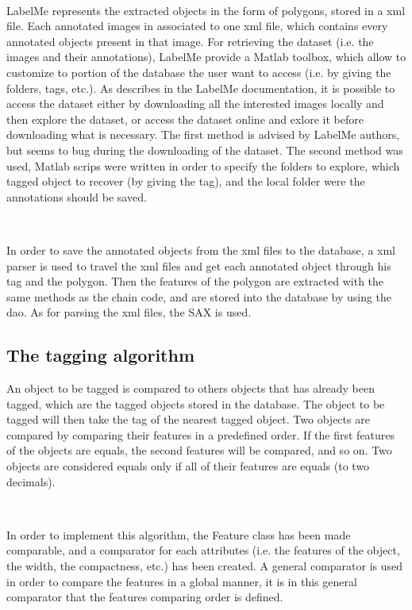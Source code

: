 ~~

LabelMe represents the extracted objects in the form of polygons, stored in a xml file. Each annotated images in associated to one xml file, which contains every annotated objects present in that image. For retrieving the dataset (i.e. the images and their annotations), LabelMe provide a Matlab toolbox, which allow to customize to portion of the database the user want to access (i.e. by giving the folders, tags, etc.). As describes in the LabelMe documentation, it is possible to access the dataset either by downloading all the interested images locally and then explore the dataset, or access the dataset online and exlore it before downloading what is necessary. The first method is advised by LabelMe authors, but seems to bug during the downloading of the dataset. The second method was used, Matlab scrips were written in order to specify the folders to explore, which tagged object to recover (by giving the tag), and the local folder were the annotations should be saved.

~~

In order to save the annotated objects from the xml files to the database, a xml parser is used to travel the xml files and get each annotated object through his tag and the polygon. Then the features of the polygon are extracted with the same methods as the chain code, and are stored into the database by using the dao. As for parsing the xml files, the \acrshort{SAX} is used. 



\subsection{The tagging algorithm}

An object to be tagged is compared to others objects that has already been tagged, which are the tagged objects stored in the database. The object to be tagged will then take the tag of the nearest tagged object. Two objects are compared by comparing their features in a predefined order. If the first features of the objects are equals, the second features will be compared, and so on. Two objects are considered equals only if all of their features are equals (to two decimals). 

~~

In order to implement this algorithm, the Feature class has been made comparable, and a comparator for each attributes (i.e. the features of the object, the width, the compactness, etc.) has been created. A general comparator is used in order to compare the features in a global manner, it is in this general comparator that the features comparing order is defined. 

